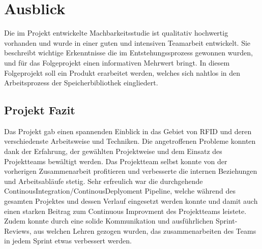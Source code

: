 \chapter{Ausblick}
\label{ch:Ausblick}
Die im Projekt entwickelte Machbarkeitsstudie ist qualitativ hochwertig vorhanden und wurde in einer guten und intensiven Teamarbeit entwickelt. Sie beschreibt wichtige Erkenntnisse die im Entstehungssprozess gewonnen wurden, und für das Folgeprojekt einen informativen Mehrwert bringt. In diesem Folgeprojekt soll ein Produkt erarbeitet werden, welches sich nahtlos in den Arbeitsprozess der Speicherbibliothek eingliedert.

\section{Projekt Fazit}
Das Projekt gab einen spannenden Einblick in das Gebiet von RFID und deren verschiedenste Arbeitsweise und Techniken. Die angetroffenen Probleme konnten dank der Erfahrung, der gewählten Projektweise und dem Einsatz des Projektteams bewältigt werden. Das Projektteam selbst konnte von der vorherigen Zusammenarbeit profitieren und verbesserte die internen Beziehungen und Arbeitsabläufe stetig. Sehr erfreulich war die durchgehende ContinousIntegration/ContinousDeplyoment Pipeline, welche während des gesamten Projektes und dessen Verlauf eingesetzt werden konnte und damit auch einen starken Beitrag zum Continuous Improvment des Projektteams leistete. Zudem konnte durch eine solide Kommunikation und ausführlichen Sprint-Reviews, aus welchen Lehren gezogen wurden, das zusammenarbeiten des Teams in jedem Sprint etwas verbessert werden.
